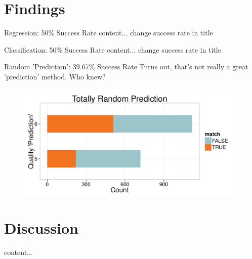 \documentclass{beamer}
\begin{document}
\section{Findings}

\begin{frame}{Regression: 50\% Success Rate}
content... change success rate in title
\end{frame}

\begin{frame}{Classification: 50\% Success Rate}
content... change success rate in title
\end{frame}


\begin{frame}{Random 'Prediction': 39.67\% Success Rate}
	Turns out, that's not really a great 'prediction' method. Who knew?
	\begin{figure}
		\centering
		\includegraphics[width=\textwidth]{../images/RandomPrediction.pdf}
	\end{figure}
\end{frame}


\section{Discussion}
\begin{frame}{}
content...

\end{frame}
\end{document}
